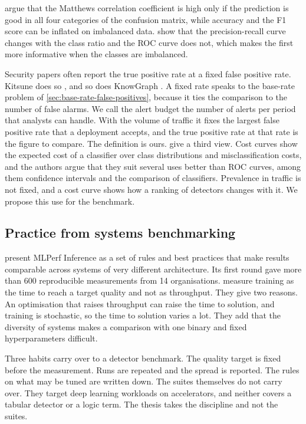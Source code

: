 \citet{chicco2020mcc} argue that the Matthews correlation coefficient is high
only if the prediction is good in all four categories of the confusion matrix,
while accuracy and the F1 score can be inflated on imbalanced data.
\citet{saito2015precision} show that the precision-recall curve changes with the
class ratio and the ROC curve does not, which makes the first more informative
when the classes are imbalanced.

Security papers often report the true positive rate at a fixed false positive
rate. Kitsune does so \citep{mirsky2018kitsune}, and so does KnowGraph
\citep{zhou2024knowgraph}. A fixed rate speaks to the base-rate problem of
\cref{sec:base-rate-false-positives}, because it ties the comparison to the
number of false alarms. We call the alert budget
the number of alerts per period that analysts can handle. With the volume of
traffic it fixes the largest false positive rate that a deployment accepts, and
the true positive rate at that rate is the figure to compare. The definition
is ours. \citet{drummond2006cost} give a third view. Cost curves show the
expected cost of a classifier over class distributions and misclassification
costs, and the authors argue that they suit several uses better than ROC
curves, among them confidence intervals and the comparison of classifiers.
Prevalence in traffic is not fixed, and a cost curve shows how a ranking of
detectors changes with it. We propose this use for the benchmark.

\subsection{Practice from systems benchmarking}
\label{sec:mlperf-practice}

\citet{reddi2020mlperf} present MLPerf Inference as a set of rules and best
practices that make results comparable across systems of very different
architecture. Its first round gave more than 600 reproducible measurements from
14 organisations. \citet{mattson2020mlperf} measure training as the time to
reach a target quality and not as throughput. They give two reasons. An
optimisation that raises throughput can raise the time to solution, and
training is stochastic, so the time to solution varies a lot. They add that
the diversity of systems makes a comparison with one binary and fixed
hyperparameters difficult.

Three habits carry over to a detector benchmark. The quality target is fixed
before the measurement. Runs are repeated and the spread is reported. The rules
on what may be tuned are written down. The suites themselves do not carry over.
They target deep learning workloads on accelerators, and neither covers a
tabular detector or a logic term. The thesis takes the discipline and not the
suites.


